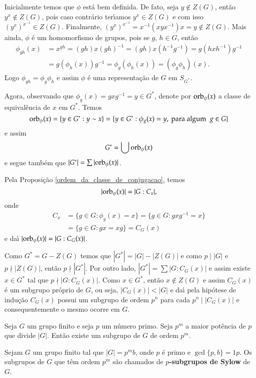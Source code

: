 \begin{prova}
Inicialmente temos que $\phi$ est{\'a} bem definida. De fato, seja $y \notin Z(G)$, ent{\~a}o $y^x \notin Z(G)$, pois caso contr{\'a}rio
ter{\'\i}amos $y^x \in Z(G)$ e com isso $(y^x)^{x^{-1}} \in Z(G)$. Finalmente, $(y^x)^{x^{-1}} = x^{-1}(xyx^{-1})x = y \notin Z(G)$.
Mais ainda, $\phi$ {\'e} um homomorfismo de grupos, pois se $g$, $h \in G$, ent{\~a}o
\begin{align*}
\phi_{gh} (x) &= x^{gh} =
(gh)x(gh)^{-1} = (gh)x(h^{-1}g^{-1}) = g(hxh^{-1})g^{-1} \\&=
g(\phi_h (x))g^{-1} = \phi_g (\phi_h (x)) = (\phi_g \phi_h)(x).
\end{align*}
Logo $\phi_{gh} = \phi_g \phi_h$ e assim $\phi$ {\'e} uma representa{\c c}{\~a}o de $G$ em $S_{G^*}$.

Agora, observando que $\phi_g(x) = gxg^{-1} = y \in G^*$, denote por ${\rm orb}_\phi (x)$ a classe de equival{\^e}ncia de $x$ em $G^*$. Temos
\[
{\rm orb}_\phi (x) = \{y \in G^* : y \sim x \} = \{y
\in G^* : \phi_g (x) = y,\ \mbox{para algum}\ \ g \in G \}
\]
e assim 
\[
G^* = \bigcup {\rm orb}_\phi (x)
\] e segue tamb{\'e}m que $|G^*| = \sum |{\rm orb}_\phi
(x)|$.

Pela Proposi\c{c}\~ao \ref{ordem_da_classe_de_conjugacao}, temos
\[
|{\rm orb}_\phi (x)| = |G : C_x|,
\]
onde
\begin{align*}
C_x &= \{g \in G : \phi_g (x) = x \} = \{g \in G
: gxg^{-1} = x \} \\
&= \{g \in G : gx = xg \} = C_G (x)
\end{align*}
e da{\'\i} $|{\rm orb}_\phi (x)| = |G : C_G (x)|$.

Como $G^* = G - Z(G)$ temos que $|G^*| = |G| - |Z(G)|$ e como $p \mid |G|$ e $p \nmid |Z(G)|$, ent{\~a}o $p \nmid |G^*|$. Por outro lado, $|G^*| = \sum
|G : C_G(x)|$ e assim existe $x \in G^*$ tal que $p \nmid |G : C_G(x)|$. Como $x \in G^*$, ent{\~a}o $x \notin Z(G)$ e assim $C_G(x)$ {\'e}
um subgrupo pr{\'o}prio de $G$, ou seja, $|C_G(x)| < |G|$ e da{\'\i} pela hip{\'o}tese de indu{\c c}{\~a}o $C_G(x)$ possui um subgrupo de ordem $p^n$
para cada $p^n \mid |C_G(x)|$ e consequentemente o mesmo ocorre em $G$.
\end{prova}

\begin{corolario}
	Seja $G$ um grupo finito e seja $p$ um n\'umero primo. Seja $p^m$ a maior pot\^encia de $p$ que divide $|G|$. Ent\~ao existe um subgrupo de $G$ de ordem $p^m$.
\end{corolario}

\begin{definicao}
Sejam $G$ um grupo finito tal que $|G| =
p^m b$, onde $p$ {\'e} primo e $\gcd\{p, b\} = 1p$. Os subgrupos de $G$ que t\^em ordem $p^m$ s\~ao chamados de
\textbf{$p$-subgrupos de Sylow} de $G$.
\end{definicao}

